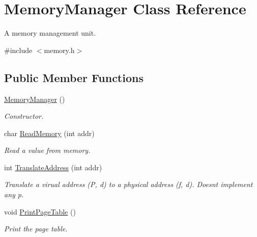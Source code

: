 \hypertarget{classMemoryManager}{}\section{Memory\+Manager Class Reference}
\label{classMemoryManager}


A memory management unit.  




{\ttfamily \#include $<$memory.\+h$>$}

\subsection*{Public Member Functions}
\begin{DoxyCompactItemize}
\item 
\hyperlink{classMemoryManager_ae925e8ad4d8fe6f0565e9d5729f59593}{Memory\+Manager} ()\hypertarget{classMemoryManager_ae925e8ad4d8fe6f0565e9d5729f59593}{}\label{classMemoryManager_ae925e8ad4d8fe6f0565e9d5729f59593}

\begin{DoxyCompactList}\small\item\em Constructor. \end{DoxyCompactList}\item 
char \hyperlink{classMemoryManager_a4a716fc46ee321ebb25bd54bcc9d0524}{Read\+Memory} (int addr)
\begin{DoxyCompactList}\small\item\em Read a value from memory. \end{DoxyCompactList}\item 
int \hyperlink{classMemoryManager_a905ceff7ad39c05c2d965af613156547}{Translate\+Address} (int addr)
\begin{DoxyCompactList}\small\item\em Translate a virual address (P, d) to a physical address (f, d). Doesn\textquotesingle{}t implement any p. \end{DoxyCompactList}\item 
void \hyperlink{classMemoryManager_aa7437efdc1ebd09895d451e2c521857a}{Print\+Page\+Table} ()\hypertarget{classMemoryManager_aa7437efdc1ebd09895d451e2c521857a}{}\label{classMemoryManager_aa7437efdc1ebd09895d451e2c521857a}

\begin{DoxyCompactList}\small\item\em Print the page table. \end{DoxyCompactList}\end{DoxyCompactItemize}


